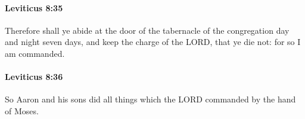 		\paragraph{Leviticus 8:35} %
			\label{LEVITICUS-8-35}

			Therefore shall ye abide at the door of the tabernacle of the congregation day and night seven days, and keep the charge of the LORD, that ye die not: for so I am commanded.


		\paragraph{Leviticus 8:36} %
			\label{LEVITICUS-8-36}

			So Aaron and his sons did all things which the LORD commanded by the hand of Moses.

